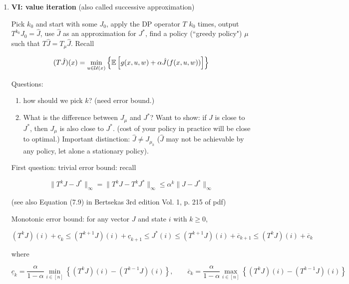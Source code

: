 \begin{enumerate}

\item \textbf{VI: value iteration} (also called successive approximation)

Pick \(k_0\) and start with some \(J_0\), apply the DP operator \(T\) \(k_0\) times, output \(T^{k_0} J_0 = \hat{J}\), use \(\hat{J}\) as an approximation for \(J^*\), find a policy (``greedy policy") \(\mu\) such that \(T \hat{J} = T_\mu \hat{J}\). Recall

\[
(T\hat{J})(x) = \min_{u \in \mathcal{U}(x)} \left\{ \mathbb{E} \left[ g(x,u,w) + \alpha \hat{J}(f(x,u,w)) \right] \right\}
\]

Questions: 

\begin{enumerate}

\item

how should we pick \(k\)? (need error bound.) 

\item What is the difference between \(J_\mu\) and \(J^*\)? Want to show: if \(\hat{J}\) is close to \(J^*\), then \(J_\mu\) is also close to \(J^*\). (cost of your policy in practice will be close to optimal.) Important distinction: \(\hat{J} \neq J_{\mu_k}\) (\(\hat{J}\) may not be achievable by any policy, let alone a stationary policy). 

\end{enumerate}

First question: trivial error bound: recall

\[
\lVert T^k J - J^* \rVert_\infty  =  \lVert T^k J -  T^k J^* \rVert_\infty  \leq \alpha^k \lVert J - J^* \rVert_\infty
\]

(see also Equation (7.9) in Bertsekas 3rd edition Vol. 1, p. 215 of pdf)


\begin{theorem}


Monotonic error bound: for any vector \(J\) and state \(i\) with \(k \geq 0\),

\[
(T^k J)(i) + \underline{c}_k \leq (T^{k+1} J)(i) + \underline{c}_{k+1} \leq J^*(i) \leq (T^{k+1}J)(i) + \overline{c}_{k+1} \leq (T^k J)(i) + \overline{c}_k
\]

where

\[
\underline{c}_k = \frac{\alpha}{1-\alpha} \min_{i \in [n]} \left\{ (T^k J)(i) - (T^{k-1}J)(i)  \right\}, \qquad \overline{c}_k = \frac{\alpha}{1-\alpha} \max_{i \in [n]} \left\{ (T^k J)(i) - (T^{k-1}J)(i)  \right\}
\]


\end{theorem}
\end{enumerate}

